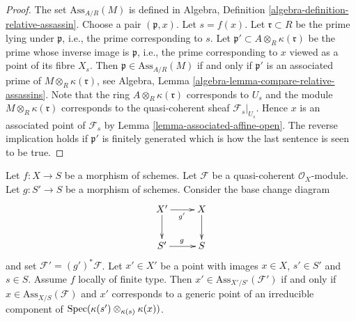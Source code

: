 \begin{proof}
The set $\text{Ass}_{A/R}(M)$ is defined in
Algebra, Definition \ref{algebra-definition-relative-assassin}.
Choose a pair $(\mathfrak p, x)$. Let $s = f(x)$.
Let $\mathfrak r \subset R$ be the prime lying under $\mathfrak p$,
i.e., the prime corresponding to $s$.
Let $\mathfrak p' \subset A \otimes_R \kappa(\mathfrak r)$
be the prime whose inverse image is $\mathfrak p$, i.e.,
the prime corresponding to $x$ viewed as a point of its fibre $X_s$.
Then $\mathfrak p \in \text{Ass}_{A/R}(M)$ if and only if
$\mathfrak p'$ is an associated prime of
$M \otimes_R \kappa(\mathfrak r)$, see
Algebra, Lemma \ref{algebra-lemma-compare-relative-assassins}.
Note that the ring $A \otimes_R \kappa(\mathfrak r)$ corresponds to $U_s$
and the module $M \otimes_R \kappa(\mathfrak r)$ corresponds to the
quasi-coherent sheaf $\mathcal{F}_s|_{U_s}$.
Hence $x$ is an associated point of $\mathcal{F}_s$
by Lemma \ref{lemma-associated-affine-open}.
The reverse implication holds if $\mathfrak p'$ is finitely generated
which is how the last sentence is seen to be true.
\end{proof}

\begin{lemma}
\label{lemma-base-change-relative-assassin}
Let $f : X \to S$ be a morphism of schemes.
Let $\mathcal{F}$ be a quasi-coherent $\mathcal{O}_X$-module.
Let $g : S' \to S$ be a morphism of schemes.
Consider the base change diagram
$$
\xymatrix{
X' \ar[d] \ar[r]_{g'} & X \ar[d] \\
S' \ar[r]^g & S
}
$$
and set $\mathcal{F}' = (g')^*\mathcal{F}$. Let $x' \in X'$ be a point
with images $x \in X$, $s' \in S'$ and $s \in S$.
Assume $f$ locally of finite type.
Then $x' \in \text{Ass}_{X'/S'}(\mathcal{F}')$ if and only if
$x \in \text{Ass}_{X/S}(\mathcal{F})$ and $x'$ corresponds to
a generic point of an irreducible component of
$\mathop{\mathrm{Spec}}(\kappa(s') \otimes_{\kappa(s)} \kappa(x))$.
\end{lemma}

